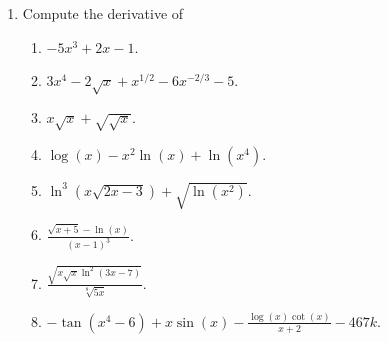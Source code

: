 \documentclass[9pt]{article}
\newcommand{\D}{\displaystyle}
\begin{document}
\begin{enumerate}
\begin{enumerate}
\begin{align*}
                        \frac{6C+2i+1}{2}j\right) \\
                     &= -\frac{5}{2}\sum_{j=1}^mj^2 +
                        \frac{6C+2i+1}{2}\sum_{j=1}^mj \\
                     &= -\frac{5}{12}m(m+1)(2m+1) + \frac{1}{4}m(m+1)(6C+2i+1)\\
                     &= \frac{1}{12} m(m+1)[3(6C + 2i + 1)-5(2m+1)].
               \end{align*}
         \item \begin{align*}
                  \sum_{l=1}^n\sum_{j=1}^k\sum_{i=1}^j (i - 4) &=
                     \sum_{l=1}^n\sum_{j=1}^k\left(\sum_{i=1}^ji -
                     \sum_{i=1}^j4\right) \\
                     &= \sum_{l=1}^n\sum_{j=1}^k\left(\frac{j(j+1)}{2} -
                        4j\right) \\
                     &= \sum_{l=1}^n\sum_{j=1}^k\left(\frac{1}{2}j^2 -
                           \frac{7}{2}j\right) \\
                     &= \sum_{l=1}^n\left(\frac{1}{2}\sum_{j=1}^kj^2 -
                           \frac{7}{2}\sum_{j=1}^kj\right) \\
                     &= \sum_{l=1}^n\left(\frac{1}{12}k(k+1)(2k+1) -
                           \frac{7}{4}k(k+1)\right) \\
                     &= \frac{1}{6} nk(k+1)(k-10).
               \end{align*}
      \end{enumerate}
   \item Compute the derivative of

         \begin{enumerate}
            \item $-5x^3 + 2x - 1$.
            \item $3x^4 - 2\sqrt{x} + x^{1/2} - 6x^{-2/3} - 5$.
            \item $x\sqrt{x} + \sqrt{\sqrt{x}}$.
            \item $\log(x) - x^2\ln(x) + \ln(x^4)$.
            \item $\ln^3(x\sqrt{2x - 3}) + \sqrt{\ln(x^2)}$.
            \item $\D\frac{\sqrt{x+5} - \ln(x)}{(x - 1)^3}$.
            \item $\D\frac{\sqrt{x\sqrt{x}\ln^2(3x - 7)}}{\sqrt[8]{5x}}$.
            \item $-\tan(x^4 - 6) + x\sin(x) -
                    \D\frac{\log(x)\cot(x)}{x+2} - 467k$.
         \end{enumerate}
      

\end{enumerate}
\end{document}
